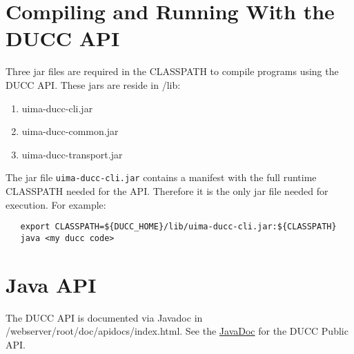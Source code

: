 \section{Compiling and Running With the DUCC API}

   Three jar files are required in the CLASSPATH to compile programs using the DUCC API.  These
   jars are reside in \ducchome/lib:
   \begin{enumerate}
     \item uima-ducc-cli.jar
     \item uima-ducc-common.jar
     \item uima-ducc-transport.jar
   \end{enumerate}
   
   The jar file {\tt uima-ducc-cli.jar} contains a manifest with the full runtime CLASSPATH
   needed for the API.  Therefore it is the only jar file needed for execution.  For
   example:
\begin{verbatim}
   export CLASSPATH=${DUCC_HOME}/lib/uima-ducc-cli.jar:${CLASSPATH}
   java <my ducc code>
\end{verbatim}

\section{Java API}
\ifpdf
   The DUCC API is documented via Javadoc in \ducchome/webserver/root/doc/apidocs/index.html.
\else
   See the \href{apidocs/index.html}{JavaDoc} for the DUCC Public API.
\fi
